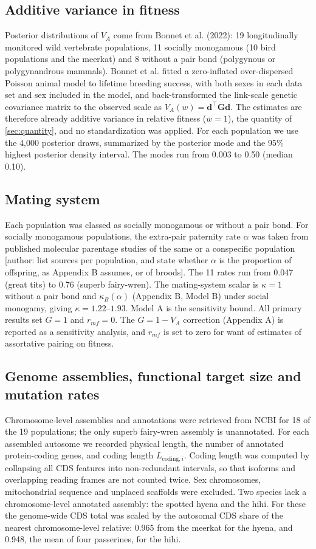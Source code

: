 \documentclass[12pt]{article}
\begin{document}
\subsection{Additive variance in fitness}
Posterior distributions of $V_A$ come from Bonnet et al. (2022): 19 longitudinally monitored wild vertebrate populations, 11 socially monogamous (10 bird populations and the meerkat) and 8 without a pair bond (polygynous or polygynandrous mammals). Bonnet et al. fitted a zero-inflated over-dispersed Poisson animal model to lifetime breeding success, with both sexes in each data set and sex included in the model, and back-transformed the link-scale genetic covariance matrix to the observed scale as $V_A(w) = \mathbf{d}^\top\mathbf{G}\mathbf{d}$. The estimates are therefore already additive variance in relative fitness ($\bar{w} = 1$), the quantity of \autoref{sec:quantity}, and no standardization was applied. For each population we use the 4,000 posterior draws, summarized by the posterior mode and the 95\% highest posterior density interval. The modes run from 0.003 to 0.50 (median 0.10).

\subsection{Mating system}
Each population was classed as socially monogamous or without a pair bond. For socially monogamous populations, the extra-pair paternity rate $\alpha$ was taken from published molecular parentage studies of the same or a conspecific population [author: list sources per population, and state whether $\alpha$ is the proportion of offspring, as Appendix B assumes, or of broods]. The 11 rates run from 0.047 (great tits) to 0.76 (superb fairy-wren). The mating-system scalar is $\kappa = 1$ without a pair bond and $\kappa_B(\alpha)$ (Appendix B, Model B) under social monogamy, giving $\kappa = 1.22$--$1.93$. Model A is the sensitivity bound. All primary results set $G = 1$ and $r_{mf} = 0$. The $G = 1 - V_A$ correction (Appendix A) is reported as a sensitivity analysis, and $r_{mf}$ is set to zero for want of estimates of assortative pairing on fitness.

\subsection{Genome assemblies, functional target size and mutation rates}
Chromosome-level assemblies and annotations were retrieved from NCBI for 18 of the 19 populations; the only superb fairy-wren assembly is unannotated. For each assembled autosome we recorded physical length, the number of annotated protein-coding genes, and coding length $L_{\text{coding},i}$. Coding length was computed by collapsing all CDS features into non-redundant intervals, so that isoforms and overlapping reading frames are not counted twice. Sex chromosomes, mitochondrial sequence and unplaced scaffolds were excluded. Two species lack a chromosome-level annotated assembly: the spotted hyena and the hihi. For these the genome-wide CDS total was scaled by the autosomal CDS share of the nearest chromosome-level relative: 0.965 from the meerkat for the hyena, and 0.948, the mean of four passerines, for the hihi.
\end{document}
